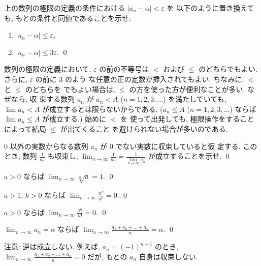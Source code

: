 \documentclass[12pt,twoside]{jarticle}
\begin{document}
\begin{question}
  上の数列の極限の定義の条件における $|a_n - \alpha| < \varepsilon$ を
  以下のように置き換えても, もとの条件と同値であることを示せ:
  \begin{enumerate}
  \item $|a_n - \alpha| \le \varepsilon$,
  \item $|a_n - \alpha| \le 3\varepsilon$.
  \qed
  \end{enumerate}
\end{question}

\noindent 数列の極限の定義において, $\varepsilon$ の前の不等号は $<$ 
および $\le$ のどちらでもよい. さらに, $\varepsilon$ の前に $3$ のよう
な任意の正の定数が挿入されてもよい. ちなみに, $<$ と $\le$ のどちらを
でもよい場合は, $\le$ の方を使った方が便利なことが多い.  なぜなら, 収
束する数列 $a_n$ が $a_n < A$ ($n=1,2,3,\ldots$) を満たしていても,
$\lim a_n < A$ が成立するとは限らないからである. ($a_n\le A$
($n=1,2,3,\ldots$) ならば $\lim a_n \le A$ が成立する.) 始めに $<$ を
使って出発しても, 極限操作をすることによって結局 $\le$ が出てくること
を避けられない場合が多いのである.

\begin{question}
  $0$ 以外の実数からなる数列 $a_n$ が $0$ でない実数に収束していると仮
  定する. このとき, 数列 $\displaystyle\frac{1}{a_n}$ も収束し,
  $\displaystyle
    \lim_{n\to\infty}\frac{1}{a_n}
    = \frac{1}{\lim\limits_{n\to\infty}a_n}
  $
  が成立することを示せ.
  \qed
\end{question}

\begin{question}
  $a>0$ ならば $\displaystyle\lim_{n\to\infty}\sqrt[n]{a}=1$.
  \qed
\end{question}

\begin{question}
  $a>1$, $k>0$ ならば $\displaystyle\lim_{n\to\infty}\frac{n^k}{a^n}=0$.
  \qed
\end{question}

\begin{question}
  $a>0$ ならば $\displaystyle\lim_{n\to\infty}\frac{a^n}{n!}=0$.
  \qed
\end{question}

\begin{question}\qstar{*}
  $\displaystyle\lim_{n\to\infty}a_n=\alpha$ ならば
  $\displaystyle\lim_{n\to\infty}\frac{a_1+a_2+\dots+a_n}{n}=\alpha$.
  \qed
\end{question}

\noindent 注意: 逆は成立しない. 例えば, $a_n = (-1)^{n-1}$ のとき,
$\displaystyle\lim_{n\to\infty}\frac{a_1+a_2+\dots+a_n}{n}=0$ だが, 
もとの $a_n$ 自身は収束しない. 
\end{document}
